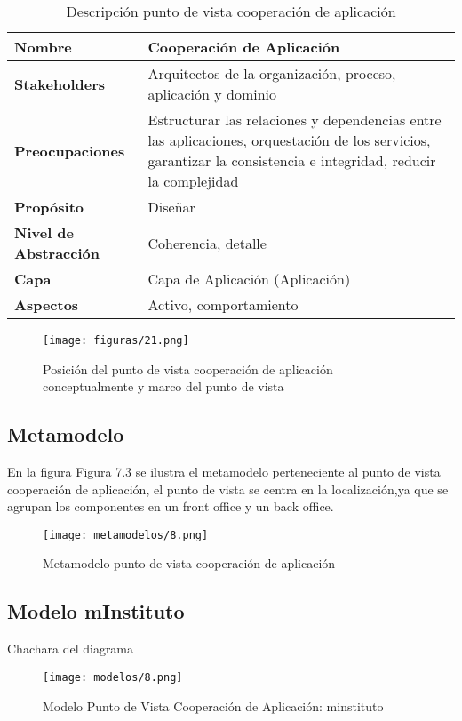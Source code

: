   \begin{table}[!h]
  	\centering
  	\begin{tabular}{lp{8cm}}
  		\toprule
  		\textbf{Nombre} & \textbf{Cooperación de Aplicación} \\
  		\midrule
  		\textbf{Stakeholders} & Arquitectos de la organización, proceso, aplicación y dominio \\
  		\textbf{Preocupaciones} & Estructurar las relaciones y dependencias entre las aplicaciones, orquestación de los servicios, garantizar la consistencia e integridad, reducir la complejidad \\
  		\textbf{Propósito} & Diseñar \\
  		\textbf{Nivel de Abstracción} & Coherencia, detalle \\
  		\textbf{Capa} & Capa de Aplicación (Aplicación) \\
  		\textbf{Aspectos} & Activo, comportamiento \\
  		\bottomrule
  	\end{tabular}
  	\captionsetup{width=.95\textwidth}
  	\caption{Descripción punto de vista cooperación de aplicación}
  	\label{tabla11}
  \end{table}

\begin{figure}[!h]
	\centering
	\texttt{[image: figuras/21.png]}
	\captionsetup{width=.95\textwidth}
	\caption{Posición del punto de vista cooperación de aplicación conceptualmente y marco del punto de vista}
	\label{figura21}
\end{figure}

\subsection{Metamodelo}
En la figura Figura 7.3 se ilustra el metamodelo perteneciente al punto de vista cooperación de aplicación, el punto de vista se centra en la localización,ya que se agrupan los componentes en un front office y un back office.

\begin{figure}[!h]
	\centering
	\texttt{[image: metamodelos/8.png]}
	\captionsetup{width=.95\textwidth}
	\caption{Metamodelo punto de vista cooperación de aplicación}
	\label{metamodelo8}
\end{figure}

\subsection{Modelo mInstituto}Chachara del diagrama
\begin{figure}[!h]
	\centering
	\texttt{[image: modelos/8.png]}
	\captionsetup{width=.95\textwidth}
	\caption{Modelo Punto de Vista Cooperación de Aplicación: minstituto}
	\label{modelo8}
\end{figure}

